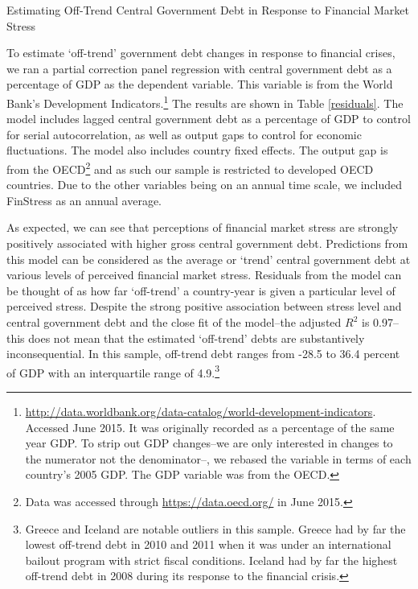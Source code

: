 \documentclass[]{article}
\begin{document}

\begin{table}
    \caption{Estimating Off-Trend Central Government Debt in Response to Financial Market Stress}
    \label{residuals}
        \begin{center}
            
        \end{center}
\end{table}

To estimate `off-trend' government debt changes in response to financial crises, we ran a partial correction panel regression with central government debt as a percentage of GDP as the dependent variable. This variable is from the World Bank's Development Indicators.\footnote{\url{http://data.worldbank.org/data-catalog/world-development-indicators}. Accessed June 2015. It was originally recorded as a percentage of the same year GDP. To strip out GDP changes--we are only interested in changes to the numerator not the denominator--, we rebased the variable in terms of each country's 2005 GDP. The GDP variable was from the OECD.} The results are shown in Table \ref{residuals}. The model includes lagged central government debt as a percentage of GDP to control for serial autocorrelation, as well as output gaps to control for economic fluctuations. The model also includes country fixed effects. The output gap is from the OECD\footnote{Data was accessed through \url{https://data.oecd.org/} in June 2015.} and as such our sample is restricted to developed OECD countries. Due to the other variables being on an annual time scale, we included FinStress as an annual average.

As expected, we can see that perceptions of financial market stress are strongly positively associated with higher gross central government debt. Predictions from this model can be considered as the average or `trend' central government debt at various levels of perceived financial market stress. Residuals from the model can be thought of as how far `off-trend' a country-year is given a particular level of perceived stress. Despite the strong positive association between stress level and central government debt and the close fit of the model--the adjusted $R^{2}$ is 0.97--this does not mean that the estimated `off-trend' debts are substantively inconsequential. In this sample, off-trend debt ranges from -28.5 to 36.4 percent of GDP with an interquartile range of 4.9.\footnote{Greece and Iceland are notable outliers in this sample. Greece had by far the lowest off-trend debt in 2010 and 2011 when it was under an international bailout program with strict fiscal conditions. Iceland had by far the highest off-trend debt in 2008 during its response to the financial crisis.}
\end{document}
